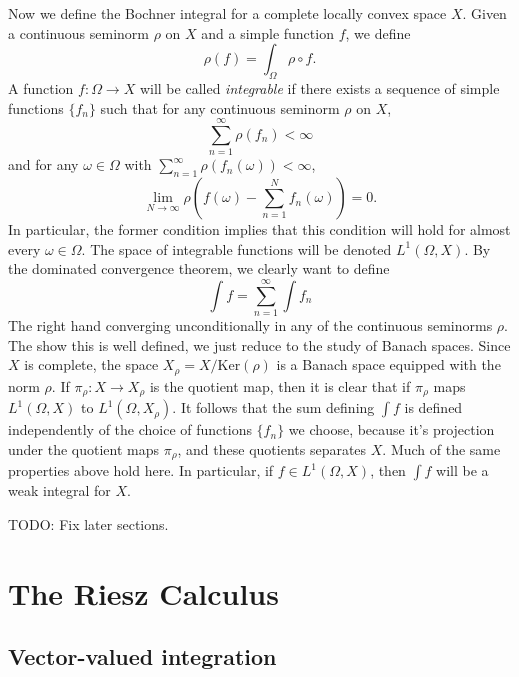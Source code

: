 Now we define the Bochner integral for a complete locally convex space $X$. Given a continuous seminorm $\rho$ on $X$ and a simple function $f$, we define
%
\[ \rho(f) = \int_\Omega \rho \circ f. \]
%
A function $f: \Omega \to X$ will be called \emph{integrable} if there exists a sequence of simple functions $\{ f_n \}$ such that for any continuous seminorm $\rho$ on $X$,
%
\[ \sum_{n = 1}^\infty \rho(f_n) < \infty \]
%
and for any $\omega \in \Omega$ with $\sum_{n = 1}^\infty \rho(f_n(\omega)) < \infty$,
%
\[ \lim_{N \to \infty} \rho \left( f(\omega) - \sum_{n = 1}^N f_n(\omega) \right) = 0. \]
%
In particular, the former condition implies that this condition will hold for almost every $\omega \in \Omega$. The space of integrable functions will be denoted $L^1(\Omega,X)$. By the dominated convergence theorem, we clearly want to define
%
\[ \int f = \sum_{n = 1}^\infty \int f_n \]
%
The right hand converging unconditionally in any of the continuous seminorms $\rho$. The show this is well defined, we just reduce to the study of Banach spaces. Since $X$ is complete, the space $X_\rho = X / \text{Ker}(\rho)$ is a Banach space equipped with the norm $\rho$. If $\pi_\rho: X \to X_\rho$ is the quotient map, then it is clear that if $\pi_\rho$ maps $L^1(\Omega,X)$ to $L^1(\Omega,X_\rho)$. It follows that the sum defining $\int f$ is defined independently of the choice of functions $\{ f_n \}$ we choose, because it's projection under the quotient maps $\pi_\rho$, and these quotients separates $X$. Much of the same properties above hold here. In particular, if $f \in L^1(\Omega,X)$, then $\int f$ will be a weak integral for $X$.

TODO: Fix later sections.

\section{The Riesz Calculus}

\subsection{Vector-valued integration}


